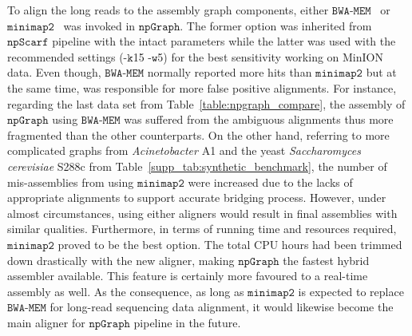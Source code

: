 \documentclass[10pt,twocolumn,twoside]{genpaper}
\newcommand{\npscarf}{$\mathtt{npScarf}$}
\newcommand{\npgraph}{$\mathtt{npGraph}$}
\newcommand{\minimap}{$\mathtt{minimap2}$}
\newcommand{\bwa}{$\mathtt{BWA\text{-}MEM}$}
\begin{document}
To align the long reads to the assembly graph components, either \bwa{}~\cite{Li2013} or \minimap{}~\cite{Li2016} was invoked in \npgraph{}. 
The former option was inherited from \npscarf{} pipeline with the intact parameters
while the latter was used with the recommended settings (-$\mathtt{k}$15 -$\mathtt{w}$5) for the best sensitivity working on MinION data.
Even though, \bwa{} normally reported more hits than \minimap{} but at the same time, was responsible for more false positive alignments.
For instance, regarding the last data set from Table~\ref{table:npgraph_compare}, the assembly of \npgraph{} using \bwa{} was suffered from the ambiguous alignments thus more fragmented than the other counterparts. 
On the other hand, referring to more complicated graphs from \emph{Acinetobacter} A1 and the yeast \emph{Saccharomyces cerevisiae} S288c from Table~\ref{supp_tab:synthetic_benchmark}, the number of mis-assemblies from using \minimap{} were increased due to the lacks of appropriate alignments to support accurate bridging process.
However, under almost circumstances, using either aligners would result in final assemblies with similar qualities.
Furthermore, in terms of running time and resources required, \minimap{} proved to be the best option. 
The total CPU hours had been trimmed down drastically with the new aligner, making \npgraph{} the fastest hybrid assembler available.
This feature is certainly more favoured to a real-time assembly as well.
As the consequence, as long as \minimap{} is expected to replace \bwa{} for long-read sequencing data alignment, it would likewise become the main aligner for \npgraph{} pipeline in the future.
\end{document}
